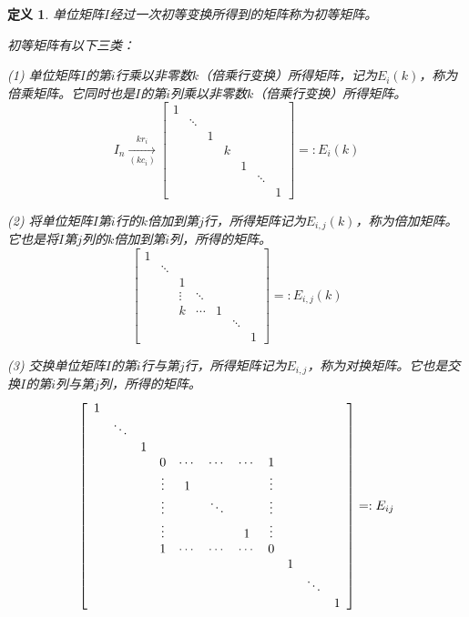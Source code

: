 \documentclass[a4paper]{book}
\newtheorem{Def}{定义}[chapter]
\newcommand{\enum}{\begin{list}{}{\setlength{\leftmargin}{0pt} \setlength{\itemindent}{2.5em} \setlength{\listparindent}{2em}}}
\begin{document}
\begin{Def}
单位矩阵$I$经过一次初等变换所得到的矩阵称为初等矩阵。

初等矩阵有以下三类：
\enum
\item[(1)] 单位矩阵$I$的第$i$行乘以非零数$k$（倍乘行变换）所得矩阵，记为$E_i(k)$，称为倍乘矩阵。它同时也是$I$的第$i$列乘以非零数$k$（倍乘行变换）所得矩阵。
$$I_n \xrightarrow[(kc_i)]{kr_i} \begin{bmatrix} 1 & & & & & & \\ & \ddots & & & & & \\ & & 1 & & & & \\ & & & k & & & \\ & & & & 1 & &  \\ & & & & & \ddots & \\ & & & & & & 1 \end{bmatrix} =: E_i(k)$$
\item[(2)] 将单位矩阵$I$第$i$行的$k$倍加到第$j$行，所得矩阵记为$E_{i,j}(k)$，称为倍加矩阵。它也是将$I$第$j$列的$k$倍加到第$i$列，所得的矩阵。
$$\begin{bmatrix} 1 & & & & & & \\ & \ddots & & & & & \\ & & 1 & & & & \\ & & \vdots & \ddots & & & \\ & & k & \cdots & 1 & &  \\ & & & & & \ddots & \\ & & & & & & 1 \end{bmatrix} =: E_{i,j}(k)$$
\item[(3)] 交换单位矩阵$I$的第$i$行与第$j$行，所得矩阵记为$E_{i,j}$，称为对换矩阵。它也是交换$I$的第$i$列与第$j$列，所得的矩阵。
$$\left[\begin{array}{*{11}c}
1 & & & & & & & & &  & \\ & \ddots & & & & & & & & & \\ & & 1 & & & & & & & & \\ & & & 0 & \cdots & \cdots & \cdots & 1 & & & \\ & & & \vdots & 1 & & & \vdots & & & \\ & & & \vdots & & \ddots & & \vdots & & & \\ & & & \vdots & & & 1 & \vdots & & & \\ & & & 1 & \cdots & \cdots & \cdots & 0 & & & \\ & & & & & & & & 1 & & \\ & & & & & & & & & \ddots & \\ & & & & & & & & & & 1 \end{array}\right] =: E_{ij}$$
\end{list}
\end{Def}
\end{document}

